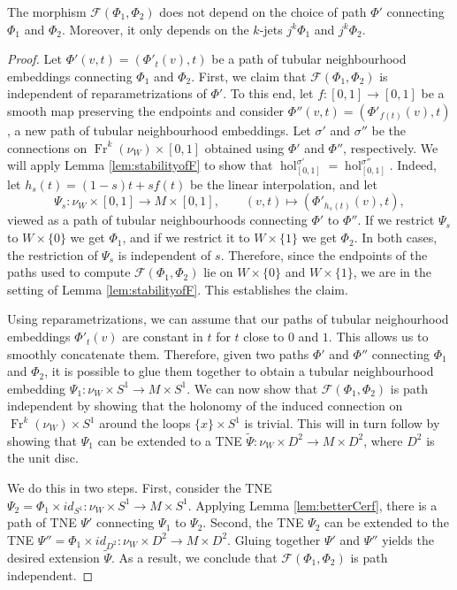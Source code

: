 \documentclass[10pt]{amsart}
\newcommand{\F}{{\mathcal{F}}}
\newcommand{\hol}{{\operatorname{hol}}}
\newcommand{\Fr}{{\operatorname{Fr}}}
\numberwithin{theoremalpha}{section}
\numberwithin{equation}{section}
\numberwithin{definition}{section}
\numberwithin{theorem}{section}
\numberwithin{proposition}{section}
\numberwithin{lemma}{section}
\numberwithin{example}{section}
\numberwithin{remark}{section}
\numberwithin{corollary}{section}
\numberwithin{question}{section}
\numberwithin{problem}{section}
\numberwithin{assumption}{section}
\theoremstyle{named}
\numberwithin{equation}{section}
\begin{document}
\begin{lemma} \label{lem:independencePaths}
The morphism $\F(\Phi_1,\Phi_2)$ does not depend on the choice of path $\Phi'$ connecting $\Phi_{1}$ and $\Phi_{2}$. Moreover, it only depends on the $k$-jets $j^k\Phi_1$ and $j^k\Phi_2$.
\end{lemma}
\begin{proof}
Let $\Phi'(v,t) = (\Phi'_t(v), t)$ be a path of tubular neighbourhood embeddings connecting $\Phi_1$ and $\Phi_2$. First, we claim that $\F(\Phi_1,\Phi_2)$ is independent of reparametrizations of $\Phi'$. To this end, let $f : [0,1] \to [0,1]$ be a smooth map preserving the endpoints and consider $\Phi''(v,t) = (\Phi'_{f(t)}(v), t)$, a new path of tubular neighbourhood embeddings. Let $\sigma'$ and $\sigma''$ be the connections on $\Fr^{k}(\nu_{W}) \times [0,1]$ obtained using $\Phi'$ and $\Phi''$, respectively. We will apply Lemma \ref{lem:stabilityofF} to show that $ \hol^{\sigma'}_{[0,1]} =  \hol^{\sigma''}_{[0,1]}$. Indeed, let $h_{s}(t) = (1-s)t + sf(t)$ be the linear interpolation, and let 
\[
\Psi_s : \nu_{W} \times [0,1] \to M \times [0,1], \qquad (v, t) \mapsto (\Phi'_{h_s(t)}(v), t),
\]
viewed as a path of tubular neighbourhoods connecting $\Phi'$ to $\Phi''$. If we restrict $\Psi_{s}$ to $W \times \{ 0 \}$ we get $\Phi_1$, and if we restrict it to $W \times \{ 1 \}$ we get $\Phi_2$. In both cases, the restriction of $\Psi_s$ is independent of $s$. Therefore, since the endpoints of the paths used to compute $\F(\Phi_1,\Phi_2)$ lie on $W \times \{0 \}$ and $W \times \{ 1\}$, we are in the setting of Lemma \ref{lem:stabilityofF}. This establishes the claim. 

Using reparametrizations, we can assume that our paths of tubular neighourhood embeddings $\Phi'_t(v)$ are constant in $t$ for $t$ close to $0$ and $1$. This allows us to smoothly concatenate them. Therefore, given two paths $\Phi'$ and $\Phi''$ connecting $\Phi_{1}$ and $\Phi_2$, it is possible to glue them together to obtain a tubular neighbourhood embedding $\Psi_1 : \nu_{W} \times S^1 \to M \times S^1$. We can now show that $\F(\Phi_1, \Phi_2)$ is path independent by showing that the holonomy of the induced connection on $\Fr^{k}(\nu_{W}) \times S^1$ around the loops $\{ x \} \times S^1$ is trivial. This will in turn follow by showing that $\Psi_1$ can be extended to a TNE $\tilde{\Psi} : \nu_{W} \times D^2 \to M \times D^2$, where $D^2$ is the unit disc. 

We do this in two steps. First, consider the TNE $\Psi_2 = \Phi_1 \times id_{S^1}: \nu_{W} \times S^1 \to M \times S^1$. Applying Lemma \ref{lem:betterCerf}, there is a path of TNE $\Psi'$ connecting $\Psi_1$ to $\Psi_2$. Second, the TNE $\Psi_2$ can be extended to the TNE $\Psi''  =  \Phi_1 \times id_{D^2} : \nu_{W} \times D^2 \to M \times D^2$. Gluing together $\Psi'$ and $\Psi''$ yields the desired extension $\tilde{\Psi}$. As a result, we conclude that $\F(\Phi_1,\Phi_2)$ is path independent. 


\end{proof}
\end{document}
